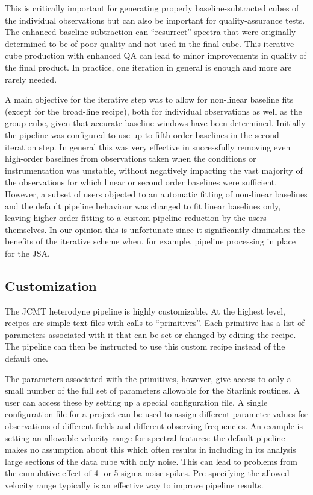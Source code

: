 \documentclass[final,authoryear,5p,times,twocolumn]{elsarticle}
\begin{document}
This is critically important for generating properly baseline-subtracted
cubes of the individual observations but can also
be important for quality-assurance tests. The enhanced baseline
subtraction can ``resurrect'' spectra that were originally determined
to be of poor quality and not used in the final cube. This iterative
cube production with enhanced QA can lead to minor improvements in
quality of the final product.  In practice, one iteration in general is enough
and more are rarely needed.

A main objective for the iterative step was to allow for non-linear baseline fits
(except for the broad-line recipe), both for individual observations as well as
the group cube, given that accurate baseline windows have been determined.
Initially the pipeline was configured to use up to fifth-order baselines in
the second iteration step. In general this was very effective in successfully
removing even high-order baselines from observations taken when the
conditions or instrumentation was unstable, without negatively impacting
the vast majority of the observations for which linear or second order baselines
were sufficient.  However, a subset of users objected to an automatic fitting of
non-linear baselines and the default pipeline behaviour was changed to
fit linear baselines only, leaving higher-order fitting to a custom pipeline reduction
by the users themselves.  In our opinion this is unfortunate since it significantly
diminishes the benefits of the iterative scheme when, for example, pipeline processing
in place for the JSA.

\subsection{Customization}

The JCMT heterodyne pipeline is highly customizable. At the highest level, recipes
are simple text files with calls to ``primitives''. Each primitive has a list of
parameters associated with it that can be set or changed by editing the recipe.
The pipeline can then be instructed to use this custom recipe instead of the default one.

The parameters associated with the primitives, however, give access to only a small
number of the full set of parameters allowable for the Starlink routines. A user can access
these by setting up a special configuration file. A single configuration file for a project can
be used to assign different parameter values for observations of different fields and
different observing frequencies. An example is setting an allowable velocity range for
spectral features: the default pipeline makes no assumption about this which often results
in including in its analysis large sections of the data cube with only noise. This can lead
to problems from the cumulative effect of 4- or 5-sigma noise spikes. Pre-specifying the
allowed velocity range typically is an effective way to improve pipeline results.
\end{document}
